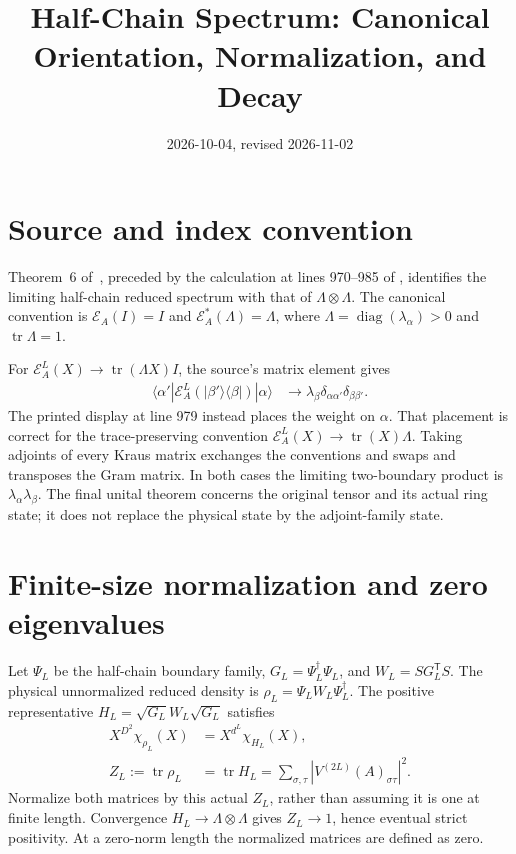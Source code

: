 \documentclass{article}
\title{Half-Chain Spectrum: Canonical Orientation, Normalization, and Decay}
\author{}
\date{2026-10-04, revised 2026-11-02}
\begin{document}
\maketitle
{}

\section{Source and index convention}
Theorem~6 of~\cite{PerezGarcia2007MPSReps}, preceded by the calculation
at lines 970--985 of , identifies
the limiting half-chain reduced spectrum with that of
$\Lambda\otimes\Lambda$. The canonical convention is
$\mathcal E_A(I)=I$ and $\mathcal E_A^*(\Lambda)=\Lambda$, where
$\Lambda=\operatorname{diag}(\lambda_\alpha)>0$ and
$\operatorname{tr}\Lambda=1$.

For $\mathcal E_A^L(X)\to\operatorname{tr}(\Lambda X)I$, the source's
matrix element gives
\begin{align}
    \langle\alpha'|\mathcal E_A^L(|\beta'\rangle\langle\beta|)|\alpha\rangle
     & \longrightarrow
    \lambda_\beta\delta_{\alpha\alpha'}\delta_{\beta\beta'}.
    \label{eq:halfchain_note_unital_gram}
\end{align}
The printed display at line 979 instead places the weight on $\alpha$.
That placement is correct for the trace-preserving convention
$\mathcal E_A^L(X)\to\operatorname{tr}(X)\Lambda$.
Taking adjoints of every Kraus matrix exchanges the conventions and swaps
and transposes the Gram matrix. In both cases the limiting two-boundary
product is $\lambda_\alpha\lambda_\beta$.
The final unital theorem concerns the original tensor and its actual ring
state; it does not replace the physical state by the adjoint-family state.

\section{Finite-size normalization and zero eigenvalues}
Let $\Psi_L$ be the half-chain boundary family, $G_L=\Psi_L^\dagger\Psi_L$,
and $W_L=SG_L^{\mathsf T}S$. The physical unnormalized reduced density is
$\rho_L=\Psi_LW_L\Psi_L^\dagger$. The positive representative
$H_L=\sqrt{G_L}W_L\sqrt{G_L}$ satisfies
\begin{align}
    X^{D^2}\chi_{\rho_L}(X) & =X^{d^L}\chi_{H_L}(X),
    \label{eq:halfchain_note_charpoly}               \\
    Z_L:=\operatorname{tr}\rho_L
                            & =\operatorname{tr}H_L
    =\sum_{\sigma,\tau}|V^{(2L)}(A)_{\sigma\tau}|^2.
    \label{eq:halfchain_note_norm}
\end{align}
Normalize both matrices by this actual $Z_L$, rather than assuming it is
one at finite length. Convergence $H_L\to\Lambda\otimes\Lambda$ gives
$Z_L\to1$, hence eventual strict positivity. At a zero-norm length the
normalized matrices are defined as zero.
\end{document}
